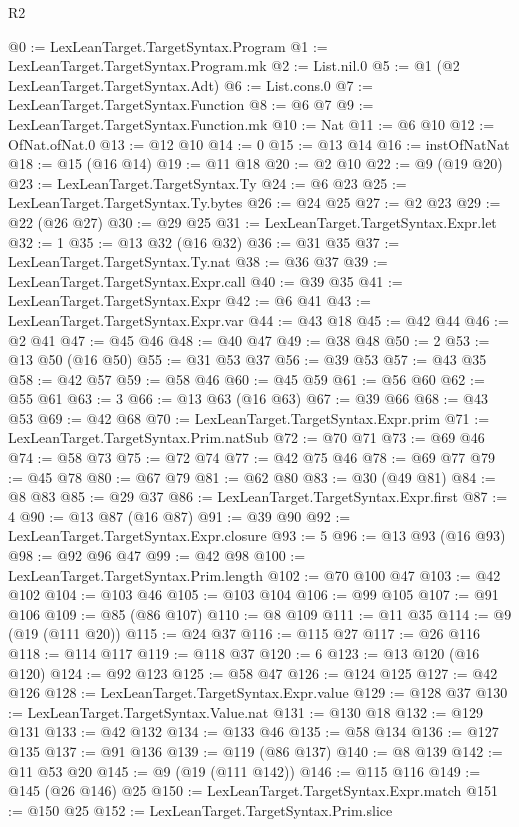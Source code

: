 \begin{lexlean}{R2}
\begin{coremodule}
@0 := LexLeanTarget.TargetSyntax.Program
@1 := LexLeanTarget.TargetSyntax.Program.mk
@2 := List.nil.{0}
@5 := @1 (@2 LexLeanTarget.TargetSyntax.Adt)
@6 := List.cons.{0}
@7 := LexLeanTarget.TargetSyntax.Function
@8 := @6 @7
@9 := LexLeanTarget.TargetSyntax.Function.mk
@10 := Nat
@11 := @6 @10
@12 := OfNat.ofNat.{0}
@13 := @12 @10
@14 := 0
@15 := @13 @14
@16 := instOfNatNat
@18 := @15 (@16 @14)
@19 := @11 @18
@20 := @2 @10
@22 := @9 (@19 @20)
@23 := LexLeanTarget.TargetSyntax.Ty
@24 := @6 @23
@25 := LexLeanTarget.TargetSyntax.Ty.bytes
@26 := @24 @25
@27 := @2 @23
@29 := @22 (@26 @27)
@30 := @29 @25
@31 := LexLeanTarget.TargetSyntax.Expr.let
@32 := 1
@35 := @13 @32 (@16 @32)
@36 := @31 @35
@37 := LexLeanTarget.TargetSyntax.Ty.nat
@38 := @36 @37
@39 := LexLeanTarget.TargetSyntax.Expr.call
@40 := @39 @35
@41 := LexLeanTarget.TargetSyntax.Expr
@42 := @6 @41
@43 := LexLeanTarget.TargetSyntax.Expr.var
@44 := @43 @18
@45 := @42 @44
@46 := @2 @41
@47 := @45 @46
@48 := @40 @47
@49 := @38 @48
@50 := 2
@53 := @13 @50 (@16 @50)
@55 := @31 @53 @37
@56 := @39 @53
@57 := @43 @35
@58 := @42 @57
@59 := @58 @46
@60 := @45 @59
@61 := @56 @60
@62 := @55 @61
@63 := 3
@66 := @13 @63 (@16 @63)
@67 := @39 @66
@68 := @43 @53
@69 := @42 @68
@70 := LexLeanTarget.TargetSyntax.Expr.prim
@71 := LexLeanTarget.TargetSyntax.Prim.natSub
@72 := @70 @71
@73 := @69 @46
@74 := @58 @73
@75 := @72 @74
@77 := @42 @75 @46
@78 := @69 @77
@79 := @45 @78
@80 := @67 @79
@81 := @62 @80
@83 := @30 (@49 @81)
@84 := @8 @83
@85 := @29 @37
@86 := LexLeanTarget.TargetSyntax.Expr.first
@87 := 4
@90 := @13 @87 (@16 @87)
@91 := @39 @90
@92 := LexLeanTarget.TargetSyntax.Expr.closure
@93 := 5
@96 := @13 @93 (@16 @93)
@98 := @92 @96 @47
@99 := @42 @98
@100 := LexLeanTarget.TargetSyntax.Prim.length
@102 := @70 @100 @47
@103 := @42 @102
@104 := @103 @46
@105 := @103 @104
@106 := @99 @105
@107 := @91 @106
@109 := @85 (@86 @107)
@110 := @8 @109
@111 := @11 @35
@114 := @9 (@19 (@111 @20))
@115 := @24 @37
@116 := @115 @27
@117 := @26 @116
@118 := @114 @117
@119 := @118 @37
@120 := 6
@123 := @13 @120 (@16 @120)
@124 := @92 @123
@125 := @58 @47
@126 := @124 @125
@127 := @42 @126
@128 := LexLeanTarget.TargetSyntax.Expr.value
@129 := @128 @37
@130 := LexLeanTarget.TargetSyntax.Value.nat
@131 := @130 @18
@132 := @129 @131
@133 := @42 @132
@134 := @133 @46
@135 := @58 @134
@136 := @127 @135
@137 := @91 @136
@139 := @119 (@86 @137)
@140 := @8 @139
@142 := @11 @53 @20
@145 := @9 (@19 (@111 @142))
@146 := @115 @116
@149 := @145 (@26 @146) @25
@150 := LexLeanTarget.TargetSyntax.Expr.match
@151 := @150 @25
@152 := LexLeanTarget.TargetSyntax.Prim.slice

\end{coremodule}
\end{lexlean}
